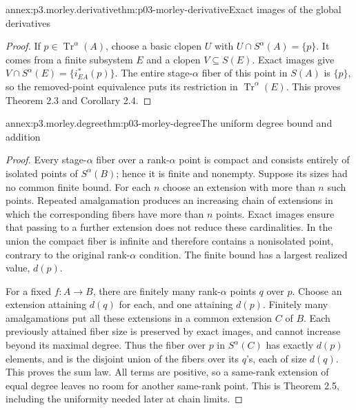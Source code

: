 \begin{annexitem}{annex:p3.morley.derivative}{thm:p03-morley-derivative}{Exact images of the global derivatives}
\begin{proof}
If \(p\in\operatorname{Tr}^\alpha(A)\), choose a basic clopen
\(U\) with \(U\cap S^\alpha(A)=\{p\}\). It comes from a
finite subsystem \(E\) and a clopen \(V\subseteq S(E)\).
Exact images give \(V\cap S^\alpha(E)=\{i_{EA}^*(p)\}\).
The entire stage-\(\alpha\) fiber of this point in \(S(A)\)
is \(\{p\}\), so the removed-point equivalence puts its
restriction in \(\operatorname{Tr}^\alpha(E)\).
This proves Theorem 2.3 and Corollary 2.4.
\end{proof}
\end{annexitem}

\begin{annexitem}{annex:p3.morley.degree}{thm:p03-morley-degree}{The uniform degree bound and addition}
\begin{proof}
Every stage-\(\alpha\) fiber over a rank-\(\alpha\) point is
compact and consists entirely of isolated points of
\(S^\alpha(B)\); hence it is finite and nonempty. Suppose its
sizes had no common finite bound. For each \(n\) choose an
extension with more than \(n\) such points. Repeated
amalgamation produces an increasing chain of extensions in
which the corresponding fibers have more than \(n\) points.
Exact images ensure that passing to a further extension does
not reduce these cardinalities. In the union the compact fiber
is infinite and therefore contains a nonisolated point, contrary
to the original rank-\(\alpha\) condition. The finite bound
has a largest realized value, \(d(p)\).

For a fixed \(f:A\to B\), there are finitely many
rank-\(\alpha\) points \(q\) over \(p\). Choose an extension
attaining \(d(q)\) for each, and one attaining \(d(p)\).
Finitely many amalgamations put all these extensions in a
common extension \(C\) of \(B\). Each previously attained
fiber size is preserved by exact images, and cannot increase
beyond its maximal degree. Thus the fiber over \(p\) in
\(S^\alpha(C)\) has exactly \(d(p)\) elements, and is the
disjoint union of the fibers over its \(q\)'s, each of size
\(d(q)\). This proves the sum law. All terms are positive,
so a same-rank extension of equal degree leaves no room for
another same-rank point. This is Theorem 2.5, including the
uniformity needed later at chain limits.
\end{proof}
\end{annexitem}

